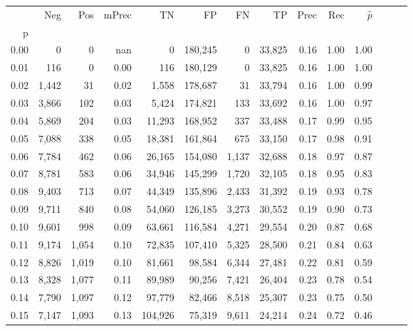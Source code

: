 \begin{tabular}{rrrrrrrrrrrrrr}
\toprule
{} &    Neg &    Pos & mPrec &       TN &       FP &      FN &      TP &  Prec &   Rec & $\hat{p}$ \\
p    &        &        &       &          &          &         &         &       &       &           \\
\midrule
0.00 &      0 &      0 &   nan &        0 &  180,245 &       0 &  33,825 &  0.16 &  1.00 &      1.00 \\
0.01 &    116 &      0 &  0.00 &      116 &  180,129 &       0 &  33,825 &  0.16 &  1.00 &      1.00 \\
0.02 &  1,442 &     31 &  0.02 &    1,558 &  178,687 &      31 &  33,794 &  0.16 &  1.00 &      0.99 \\
0.03 &  3,866 &    102 &  0.03 &    5,424 &  174,821 &     133 &  33,692 &  0.16 &  1.00 &      0.97 \\
0.04 &  5,869 &    204 &  0.03 &   11,293 &  168,952 &     337 &  33,488 &  0.17 &  0.99 &      0.95 \\
0.05 &  7,088 &    338 &  0.05 &   18,381 &  161,864 &     675 &  33,150 &  0.17 &  0.98 &      0.91 \\
0.06 &  7,784 &    462 &  0.06 &   26,165 &  154,080 &   1,137 &  32,688 &  0.18 &  0.97 &      0.87 \\
0.07 &  8,781 &    583 &  0.06 &   34,946 &  145,299 &   1,720 &  32,105 &  0.18 &  0.95 &      0.83 \\
0.08 &  9,403 &    713 &  0.07 &   44,349 &  135,896 &   2,433 &  31,392 &  0.19 &  0.93 &      0.78 \\
0.09 &  9,711 &    840 &  0.08 &   54,060 &  126,185 &   3,273 &  30,552 &  0.19 &  0.90 &      0.73 \\
0.10 &  9,601 &    998 &  0.09 &   63,661 &  116,584 &   4,271 &  29,554 &  0.20 &  0.87 &      0.68 \\
0.11 &  9,174 &  1,054 &  0.10 &   72,835 &  107,410 &   5,325 &  28,500 &  0.21 &  0.84 &      0.63 \\
0.12 &  8,826 &  1,019 &  0.10 &   81,661 &   98,584 &   6,344 &  27,481 &  0.22 &  0.81 &      0.59 \\
0.13 &  8,328 &  1,077 &  0.11 &   89,989 &   90,256 &   7,421 &  26,404 &  0.23 &  0.78 &      0.54 \\
0.14 &  7,790 &  1,097 &  0.12 &   97,779 &   82,466 &   8,518 &  25,307 &  0.23 &  0.75 &      0.50 \\
0.15 &  7,147 &  1,093 &  0.13 &  104,926 &   75,319 &   9,611 &  24,214 &  0.24 &  0.72 &      0.46 \\

\end{tabular}
